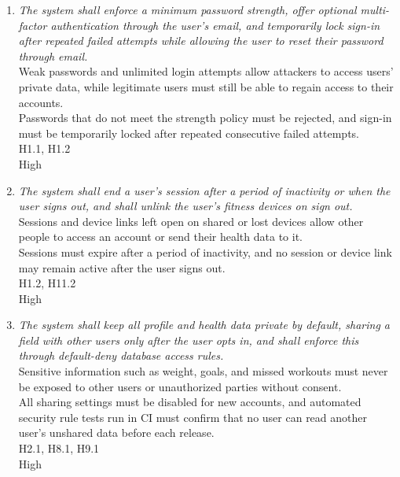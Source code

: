 \documentclass{article}
\begin{document}
\begin{enumerate}[{SR}1:]

\item \hypertarget{sr1}{}\emph{The system shall enforce a minimum password strength, offer optional multi-factor authentication through the user's email, and temporarily lock sign-in after repeated failed attempts while allowing the user to reset their password through email.}\\
     Weak passwords and unlimited login attempts allow attackers to access users' private data, while legitimate users must still be able to regain access to their accounts.\\
     Passwords that do not meet the strength policy must be rejected, and sign-in must be temporarily locked after repeated consecutive failed attempts.\\
     H1.1, H1.2\\
     High

\item \hypertarget{sr2}{}\emph{The system shall end a user's session after a period of inactivity or when the user signs out, and shall unlink the user's fitness devices on sign out.}\\
     Sessions and device links left open on shared or lost devices allow other people to access an account or send their health data to it.\\
     Sessions must expire after a period of inactivity, and no session or device link may remain active after the user signs out.\\
     H1.2, H11.2\\
     High

\item \hypertarget{sr3}{}\emph{The system shall keep all profile and health data private by default, sharing a field with other users only after the user opts in, and shall enforce this through default-deny database access rules.}\\
     Sensitive information such as weight, goals, and missed workouts must never be exposed to other users or unauthorized parties without consent.\\
     All sharing settings must be disabled for new accounts, and automated security rule tests run in CI must confirm that no user can read another user's unshared data before each release.\\
     H2.1, H8.1, H9.1\\
     High


\end{enumerate}
\end{document}
